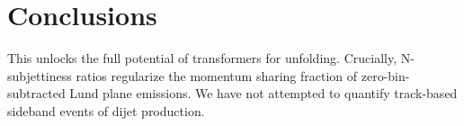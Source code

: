 \section{Conclusions}\label{sec:conclusions}

This unlocks the full potential of transformers for unfolding.
Crucially, N-subjettiness ratios regularize the momentum sharing
fraction of zero-bin-subtracted Lund plane emissions. We have not
attempted to quantify track-based sideband events of dijet production.

